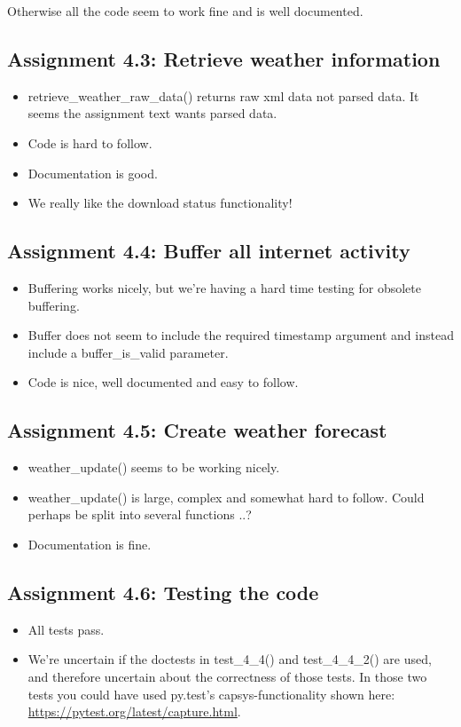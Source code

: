 \documentclass[a4paper]{article}
\begin{document}
Otherwise all the code seem to work fine and is well documented.

\subsection*{Assignment 4.3: Retrieve weather information}
\begin{itemize}
\item retrieve\_weather\_raw\_data() returns raw xml data not parsed data. It seems the assignment text wants parsed data.
\item Code is hard to follow.
\item Documentation is good.
\item We really like the download status functionality!
\end{itemize}

\subsection*{Assignment 4.4: Buffer all internet activity}
\begin{itemize}
\item Buffering works nicely, but we're having a hard time testing for obsolete buffering.
\item Buffer does not seem to include the required timestamp argument and instead include a buffer\_is\_valid parameter.
\item Code is nice, well documented and easy to follow.
\end{itemize}

\subsection*{Assignment 4.5: Create weather forecast}
\begin{itemize}
\item weather\_update() seems to be working nicely.
\item weather\_update() is large, complex and somewhat hard to follow. Could perhaps be split into several functions ..?
\item Documentation is fine.
\end{itemize}

\subsection*{Assignment 4.6: Testing the code}
\begin{itemize}
\item All tests pass.
\item We're uncertain if the doctests in test\_4\_4() and test\_4\_4\_2() are used, and therefore uncertain about the correctness of those tests. In those two tests you could have used py.test's capsys-functionality shown here:\\ \href{https://pytest.org/latest/capture.html}{https://pytest.org/latest/capture.html}.
\end{itemize}
\end{document}
